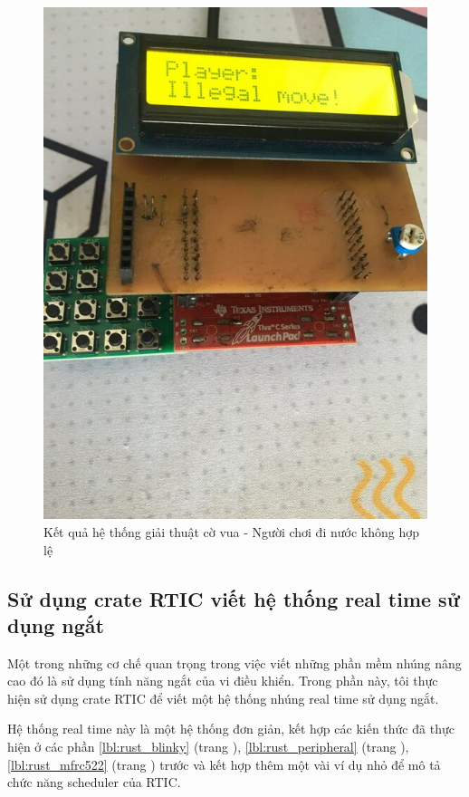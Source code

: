 \begin{figure}[ht]
\centering
\includegraphics[scale=0.4]{images/chess_illegal.jpg}
\caption{Kết quả hệ thống giải thuật cờ vua - Người chơi đi nước không hợp lệ}
\label{fig:chess_illegal}
\end{figure}

\clearpage
\subsection{Sử dụng crate RTIC viết hệ thống real time sử dụng ngắt}\label{lbl:rust_rtic}
Một trong những cơ chế quan trọng trong việc viết những phần mềm nhúng nâng cao đó là sử dụng tính năng ngắt của vi điều khiển.
Trong phần này, tôi thực hiện sử dụng crate RTIC \cite{rtic_website} để viết một hệ thống nhúng real time sử dụng ngắt.

Hệ thống real time này là một hệ thống đơn giản, kết hợp các kiến thức đã thực hiện ở các phần \ref{lbl:rust_blinky} (trang \pageref{lbl:rust_blinky}), \ref{lbl:rust_peripheral} (trang \pageref{lbl:rust_peripheral}), \ref{lbl:rust_mfrc522} (trang \pageref{lbl:rust_mfrc522}) trước và kết hợp thêm một vài ví dụ nhỏ để mô tả chức năng scheduler của RTIC.

